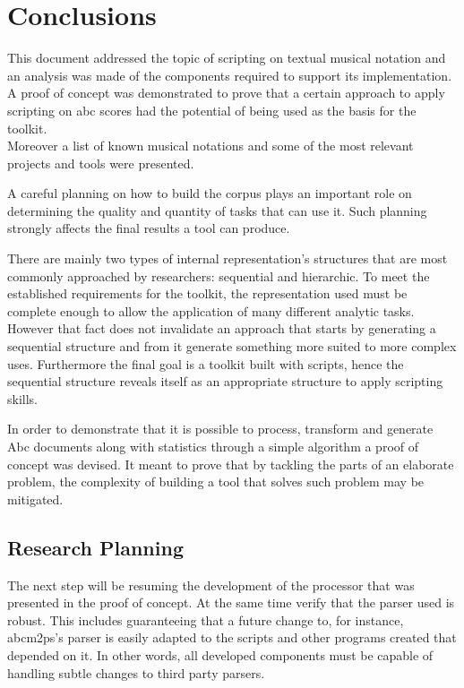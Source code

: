 \documentclass[main.tex]{subfiles}
\begin{document}
\chapter{Conclusions}


This document addressed the topic of scripting on textual musical notation and an analysis was made
of the components required to support its implementation.\\
A proof of concept was demonstrated to prove that a certain approach to apply scripting on abc
scores had the potential of being used as the basis for the toolkit.\\
Moreover a list of known musical notations and some of the most relevant projects and tools were
presented.

A careful planning on how to build the corpus plays an important role on determining the quality and
quantity of tasks that can use it. Such planning strongly affects the final results a tool can
produce.

There are mainly two types of internal representation's structures that are most commonly approached
by researchers: sequential and hierarchic. To meet the established requirements for the toolkit, the
representation used must be complete enough to allow the application of many different analytic
tasks. However that fact does not invalidate an approach that starts by generating a sequential
structure and from it generate something more suited to more complex uses. Furthermore the final
goal is a toolkit built with scripts, hence the sequential structure reveals itself as an
appropriate structure to apply scripting skills. 

In order to demonstrate that it is possible to process, transform and generate Abc documents along
with statistics through a simple algorithm a proof of concept was devised. It meant to prove that by
tackling the parts of an elaborate problem, the complexity of building a tool that solves such
problem may be mitigated.


\section{Research Planning}

The next step will be resuming the development of the processor that was presented in the proof of
concept. At the same time verify that the parser used is robust. This includes guaranteeing that a
future change to, for instance, abcm2ps's parser is easily adapted to the scripts and other programs
created that depended on it. In other words, all developed components must be capable of handling
subtle changes to third party parsers.
\end{document}
